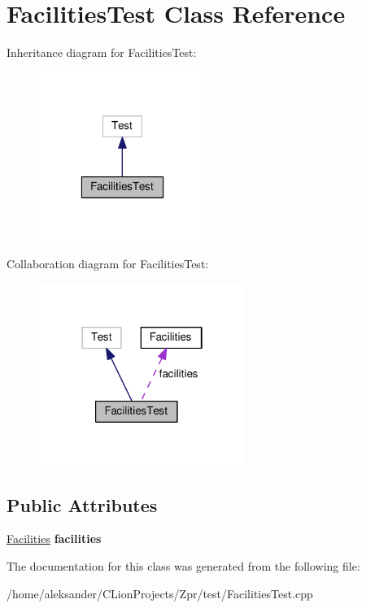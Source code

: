 \hypertarget{classFacilitiesTest}{\section{Facilities\-Test Class Reference}
\label{classFacilitiesTest}
}


Inheritance diagram for Facilities\-Test\-:
\nopagebreak
\begin{figure}[H]
\begin{center}
\leavevmode
\includegraphics[width=154pt]{classFacilitiesTest__inherit__graph}
\end{center}
\end{figure}


Collaboration diagram for Facilities\-Test\-:
\nopagebreak
\begin{figure}[H]
\begin{center}
\leavevmode
\includegraphics[width=190pt]{classFacilitiesTest__coll__graph}
\end{center}
\end{figure}
\subsection*{Public Attributes}
\begin{DoxyCompactItemize}
\item 
\hypertarget{classFacilitiesTest_afaf29496a8534f15a46465f571a2da26}{\hyperlink{classFacilities}{Facilities} {\bfseries facilities}}\label{classFacilitiesTest_afaf29496a8534f15a46465f571a2da26}

\end{DoxyCompactItemize}


The documentation for this class was generated from the following file\-:\begin{DoxyCompactItemize}
\item 
/home/aleksander/\-C\-Lion\-Projects/\-Zpr/test/Facilities\-Test.\-cpp\end{DoxyCompactItemize}
